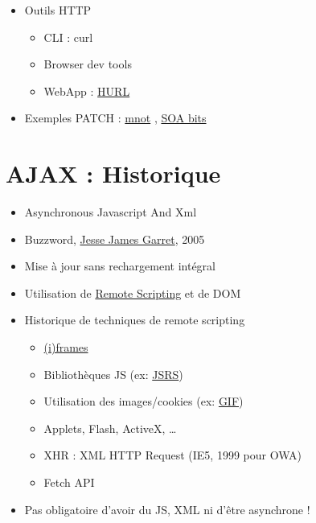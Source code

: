 \begin{itemize}
\tightlist
\item
  Outils HTTP

  \begin{itemize}
  \tightlist
  \item
    CLI : curl
  \item
    Browser dev tools
  \item
    WebApp : \href{http://hurl.it/}{HURL}
  \end{itemize}
\item
  Exemples PATCH :
  \href{http://www.mnot.net/blog/2012/09/05/patch}{mnot} ,
  \href{http://soabits.blogspot.ch/2013/01/http-put-patch-or-post-partial-updates.html}{SOA
  bits}
\end{itemize}

\hypertarget{ajax-historique}{%
\section{AJAX : Historique}\label{ajax-historique}}

\begin{itemize}
\tightlist
\item
  Asynchronous Javascript And Xml
\item
  Buzzword,
  \href{http://web.archive.org/web/20110102130434/http://www.adaptivepath.com/ideas/essays/archives/000385.php}{Jesse
  James Garret}, 2005
\item
  Mise à jour sans rechargement intégral
\item
  Utilisation de
  \href{https://en.wikipedia.org/wiki/Remote_scripting}{Remote
  Scripting} et de DOM
\item
  Historique de techniques de remote scripting

  \begin{itemize}
  \tightlist
  \item
    \href{http://archive.oreilly.com/pub/a/javascript/2002/02/08/iframe.html}{(i)frames}
  \item
    Bibliothèques JS (ex:
    \href{http://www.ashleyit.com/rs/jsrs/test.htm}{JSRS})
  \item
    Utilisation des images/cookies (ex:
    \href{http://web.archive.org/web/20100916110710/http://depressedpress.com/Content/Development/JavaScript/Articles/GIFAsPipe/Index.cfm}{GIF})
  \item
    Applets, Flash, ActiveX, \ldots{}
  \item
    {XHR : XML HTTP Request} (IE5, 1999 pour OWA)
  \item
    Fetch API
  \end{itemize}
\item
  Pas obligatoire d'avoir du JS, XML ni d'être asynchrone !
\end{itemize}

